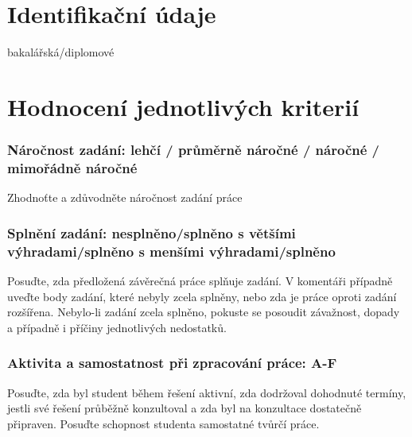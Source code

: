 \documentclass{article}
\date{}
\begin{document}
\section{Identifikační údaje}

\begin{description}[nosep]
\item[Název práce:] %
\item[Jméno autora:] %
\item[Typ práce:] bakalářská/diplomové %
\item[Fakulta/ústav:] %
\item[Jméno vedoucího:] %
\item[Pracoviště vedoucího:]%
\end{description}

\section{Hodnocení jednotlivých kriterií}

\subsubsection*{Náročnost zadání: {lehčí} / {průměrně náročné} / {náročné} / {mimořádně náročné}} %
Zhodnoťte a zdůvodněte náročnost zadání práce 

\subsubsection*{Splnění zadání: {nesplněno}/{splněno s většími výhradami}/{splněno s menšími výhradami}/{splněno}} %
Posuďte, zda předložená závěrečná práce splňuje zadání. V komentáři případně uveďte body zadání, které nebyly zcela splněny, nebo zda je práce oproti zadání rozšířena. Nebylo-li zadání zcela splněno, pokuste se posoudit závažnost, dopady a případně i příčiny jednotlivých nedostatků.

\subsubsection*{Aktivita a samostatnost při zpracování práce: A-F} %
Posuďte, zda byl student během řešení aktivní, zda dodržoval dohodnuté termíny, jestli své řešení průběžně konzultoval a zda byl na konzultace dostatečně připraven. Posuďte schopnost studenta samostatné tvůrčí práce.
\end{document}
